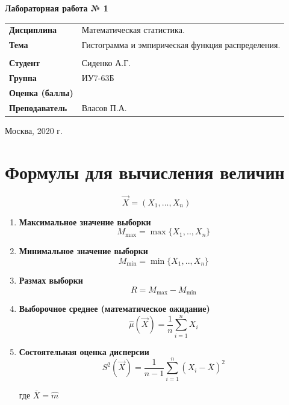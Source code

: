 \documentclass[a4paper,14pt]{extreport} %
\begin{document}
\begin{titlepage}
    \vspace{2cm}

    \begin{center}
        \textbf{Лабораторная работа № 1} \\
        \vspace{0.5cm}
    \end{center}

    \vspace{4cm}

    \begin{flushleft}
        \begin{tabular}{ll}
            \textbf{Дисциплина} & Математическая статистика.  \\
            \textbf{Тема} & Гистограмма и эмпирическая функция распределения.   \\
            \\
            \textbf{Студент} & Сиденко А.Г. \\
            \textbf{Группа} & ИУ7-63Б \\
            \textbf{Оценка (баллы)} & \\
            \textbf{Преподаватель} & Власов П.А.   \\
        \end{tabular}
    \end{flushleft}

    \vspace{4cm}

   \begin{center}
        Москва, 2020 г.
    \end{center}

\end{titlepage}

\section{Формулы для вычисления величин}

$$\vec X=(X_1, ..., X_n)$$

\begin{enumerate}
\item \textbf{Максимальное значение выборки}
$$M_{\max} = \max\{X_1, .., X_n\}$$
\item \textbf{Минимальное значение выборки}
$$M_{\min} = \min\{X_1, .., X_n\}$$
\item \textbf{Размах выборки}
$$R = M_{\max} - M_{\min}$$
\item \textbf{Выборочное среднее (математическое ожидание)}
$$\hat \mu(\vec X) = \frac{1}{n} \sum_{i=1}^n X_i$$
\item \textbf{Состоятельная оценка дисперсии}
$$S^2 (\vec X) = \frac{1}{n-1} \sum_{i=1}^n (X_i - \overline X)^2$$

где $ \overline{X} = \hat m $
\end{enumerate}
\end{document}
